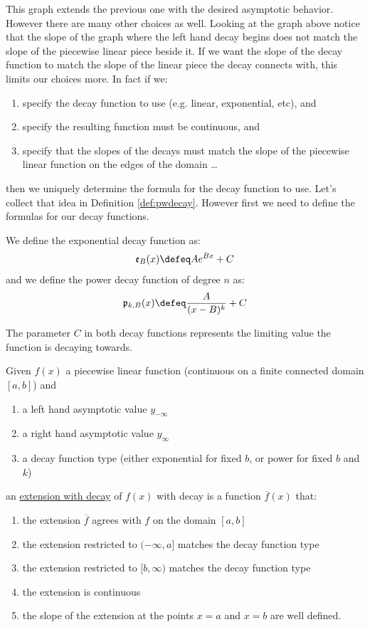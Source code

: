 \documentclass[10pt]{article}
\begin{document}
This graph extends the previous one with the desired asymptotic behavior.
However there are many other choices as well.  Looking at the graph above
notice that the slope of the graph where the left hand decay begins does
not match the slope of the piecewise linear piece beside it.  If we want
the slope of the decay function to match the slope of the linear piece the
decay connects with, this limits our choices more.  In fact if we:
\begin{enumerate}
\item specify the decay function to use (e.g. linear, exponential, etc), and
\item specify the resulting function must be continuous, and
\item specify that the slopes of the decays must match the slope of the piecewise linear
function on the edges of the domain \ldots
\end{enumerate}
then we uniquely determine the formula for the decay function to use.  Let's
collect that idea in Definition \ref{def:pwdecay}.  However first we need to
define the formulas for our decay functions.
\begin{definition}
We define the exponential decay function as:
$$\mathfrak{e}_B(x) \defeq Ae^{Bx}+C$$
and we define the power decay function of degree $n$ as:
$$\mathfrak{p}_{k,B}(x) \defeq \frac{A}{(x-B)^k}+C$$
\end{definition}
\begin{note}
The parameter $C$ in both decay functions represents the limiting value
the function is decaying towards.
\end{note}
\begin{definition}
\label{def:pwdecay}
Given $f(x)$ a piecewise linear function (continuous on a finite connected domain $[a,b]$) and
\begin{enumerate}
\item a left hand asymptotic value $y_{-\infty}$
\item a right hand asymptotic value $y_{\infty}$
\item a decay function type (either exponential for fixed $b$, or power for fixed $b$ and $k$)
\end{enumerate}
an \ul{extension with decay} of $f(x)$ with decay is a function $\overline{f}(x)$ that:
\begin{enumerate}
\item the extension $\overline{f}$ agrees with $f$ on the domain $[a,b]$
\item the extension restricted to $(-\infty, a]$ matches the decay function type
\item the extension restricted to $[b, \infty)$ matches the decay function type
\item the extension is continuous
\item the slope of the extension at the points $x=a$ and $x=b$ are well defined.
\end{enumerate}
\end{definition}
\end{document}
